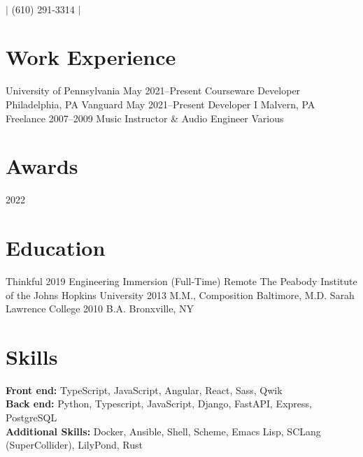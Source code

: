 \documentclass{article}
\begin{document}
\begin{flushleft}
   \\
  $|$
  \small{(610) 291-3314}
  $|$
\end{flushleft}

\section*{Work Experience}

\sectionLine

\begin{itemize}[leftmargin=0em, label={}]
    \experience
        {University of Pennsylvania}
        {May 2021--Present}
        {Courseware Developer}
        {Philadelphia, PA}
    \experience
        {Vanguard}
        {May 2021--Present}
        {Developer I}
        {Malvern, PA}
    \experience
        {Freelance}
        {2007--2009}
        {Music Instructor \& Audio Engineer}
        {Various}
\end{itemize}

\section*{Awards}

\sectionLine

\begin{itemize}[leftmargin=0em, label={}]
        {2022}
\end{itemize}

\section*{Education}

\sectionLine

\begin{itemize}[leftmargin=0em, label={}]
    \experience
        {Thinkful}
        {2019}
        {Engineering Immersion (Full-Time)}
        {Remote}
    \experience
        {The Peabody Institute of the Johns Hopkins University}
        {2013}
        {M.M., Composition}
        {Baltimore, M.D.}
    \experience
        {Sarah Lawrence College}
        {2010}
        {B.A.}
        {Bronxville, NY}
\end{itemize}

\section*{Skills}

\sectionLine

\textbf{Front end:} TypeScript, JavaScript, Angular, React, Sass, Qwik \\
\textbf{Back end:} Python, Typescript, JavaScript, Django, FastAPI, Express,
PostgreSQL \\
\textbf{Additional Skills:} Docker, Ansible, Shell, Scheme, Emacs Lisp, SCLang
(SuperCollider), LilyPond, Rust
\end{document}
